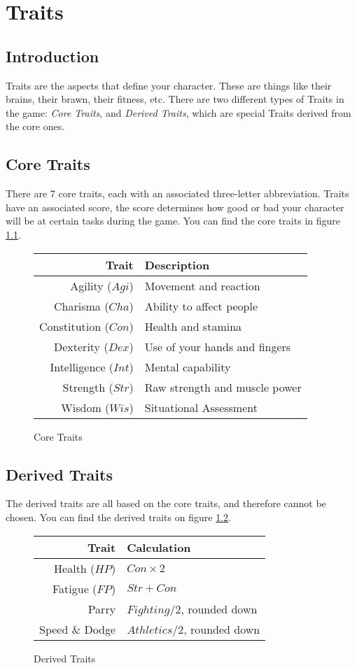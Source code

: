 \chapter{Traits}
\section{Introduction}
Traits are the aspects that define your character. These are things like their brains, their brawn, their fitness, etc. There are two different types of Traits in the game: \textit{Core Traits}, and \textit{Derived Traits}, which are special Traits derived from the core ones.
\section{Core Traits}
There are 7 core traits, each with an associated three-letter abbreviation.
Traits have an associated score, the score determines how good or bad your character will be at certain tasks during the game. You can find the core traits in figure \ref{fig:core_traits}.
\begin{figure}[!h]
    \centering
    \begin{tabular}{r | l}
        \textbf{Trait}  & \textbf{Description} \\\hline
        Agility      ($Agi$) & Movement and reaction \\
        Charisma     ($Cha$) & Ability to affect people \\
        Constitution ($Con$) & Health and stamina \\
        Dexterity    ($Dex$) & Use of your hands and fingers \\
        Intelligence ($Int$) & Mental capability \\
        Strength     ($Str$) & Raw strength and muscle power \\
        Wisdom       ($Wis$) & Situational Assessment
    \end{tabular}
    \caption{Core Traits}
    \label{fig:core_traits}
\end{figure}

\section{Derived Traits}
The derived traits are all based on the core traits, and therefore cannot be chosen. You can find the derived traits on figure \ref{fig:derived_traits}.

\begin{figure}[!ht]
    \centering
\begin{tabular}{r | l}
    \textbf{Trait} & \textbf{Calculation} \\\hline
    Health ($HP$)  & $Con\times 2$ \\
    Fatigue ($FP$) & $Str+Con$ \\
    Parry          & $Fighting/2$, rounded down\\
    Speed \& Dodge & $Athletics / 2$, rounded down\\
\end{tabular}
    \caption{Derived Traits}
    \label{fig:derived_traits}
\end{figure}

